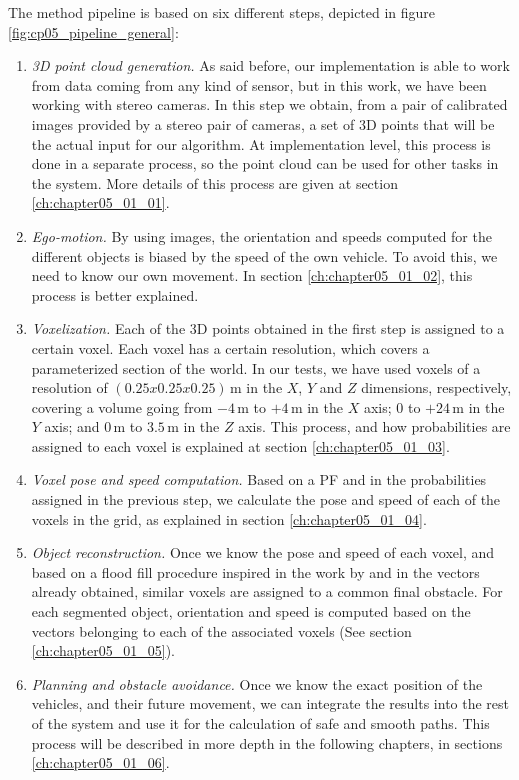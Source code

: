 The method pipeline is based on six different steps, depicted in figure \ref{fig:cp05_pipeline_general}:
\begin{enumerate}
 \item \emph{3D point cloud generation.} As said before, our implementation is able to work from data coming from any kind of sensor, but in this work, we have been working with stereo cameras. In this step we obtain, from a pair of calibrated images provided by a stereo pair of cameras, a set of 3D points that will be the actual input for our algorithm. At implementation level, this process is done in a separate process, so the point cloud can be used for other tasks in the system. More details of this process are given at section \ref{ch:chapter05_01_01}.
 \item \emph{Ego-motion.} By using images, the orientation and speeds computed for the different objects is biased by the speed of the own vehicle. To avoid this, we need to know our own movement. In section \ref{ch:chapter05_01_02}, this process is better explained.
 \item \emph{Voxelization.} Each of the 3D points obtained in the first step is assigned to a certain voxel. Each voxel has a certain resolution, which covers a parameterized section of the world. In our tests, we have used voxels of a resolution of $(0.25x0.25x0.25)$\,m in the $X$, $Y$ and $Z$ dimensions, respectively, covering a volume going from $-4$\,m to $+4$\,m in the $X$ axis; $0$ to $+24$\,m in the $Y$ axis; and $0$\,m to $3.5$\,m in the $Z$ axis. This process, and how probabilities are assigned to each voxel is explained at section \ref{ch:chapter05_01_03}.
 \item \emph{Voxel pose and speed computation.} Based on a \ac{PF} and in the probabilities assigned in the previous step, we calculate the pose and speed of each of the voxels in the grid, as explained in section \ref{ch:chapter05_01_04}.
 \item \emph{Object reconstruction.} Once we know the pose and speed of each voxel, and based on a flood fill procedure inspired in the work by \cite{broggi2013} and in the vectors already obtained, similar voxels are assigned to a common final obstacle. For each segmented object, orientation and speed is computed based on the vectors belonging to each of the associated voxels (See section \ref{ch:chapter05_01_05}).
 \item \emph{Planning and obstacle avoidance.} Once we know the exact position of the vehicles, and their future movement, we can integrate the results into the rest of the system and use it for the calculation of safe and smooth paths. This process will be described in more depth in the following chapters, in sections \ref{ch:chapter05_01_06}.
\end{enumerate}

